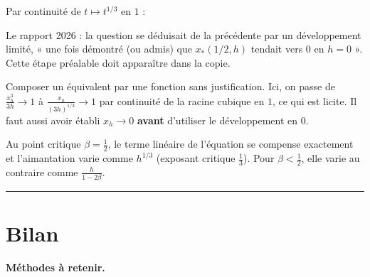 \documentclass[11pt,a4paper]{article}
\newcommand{\equationajustee}[1]{%
  \sbox{\boiteequation}{$\displaystyle #1$}%
  \ifdim\wd\boiteequation>\linewidth
    \[\resizebox{\linewidth}{!}{\usebox{\boiteequation}}\]%
  \else
    \[#1\]%
  \fi}
\begin{document}
Par continuité de \(t\mapsto t^{1/3}\) en \(1\) :
\equationajustee{\boxed{\lim_{\substack{h\to0\\h>0}}\frac{x_*(\frac12,h)}{(3h)^{1/3}}=1}}

\begin{jury}

Le rapport 2026 : la question se déduisait de la précédente par un développement limité, « une fois démontré (ou admis) que \(x_{*}(1/2, h)\) tendait vers 0 en \(h = 0\) ». Cette étape préalable doit apparaître dans la copie.

\end{jury}

\begin{piege}

Composer un équivalent par une fonction sans justification. Ici, on passe de \(\frac{x_h^3}{3h}\to1\) à \(\frac{x_h}{(3h)^{1/3}}\to1\) par continuité de la racine cubique en \(1\), ce qui est licite. Il faut aussi avoir établi \(x_h\to0\) \textbf{avant} d'utiliser le développement en \(0\).

\end{piege}

\begin{methode}

Au point critique \(\beta=\frac12\), le terme linéaire de l'équation se compense exactement et l'aimantation varie comme \(h^{1/3}\) (exposant critique \(\frac13\)). Pour \(\beta<\frac12\), elle varie au contraire comme \(\frac{h}{1-2\beta}\).

\end{methode}

\begin{center}\rule{0.5\linewidth}{0.5pt}\end{center}

\hypertarget{bilan}{%
\section{Bilan}\label{bilan}}

\textbf{Méthodes à retenir.}
\end{document}
